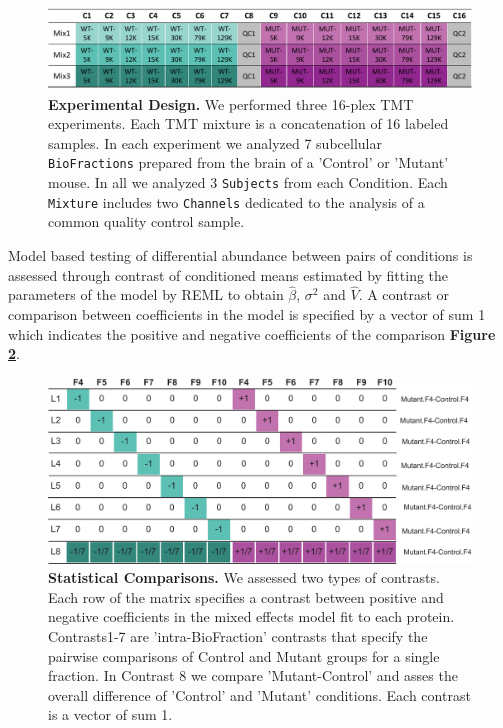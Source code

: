 \documentclass[11pt]{elife}\usepackage[]{graphicx}\usepackage[]{color}
\begin{document}
\begin{figure}[h]
  \begin{fullwidth}
  \begin{center}
	  \includegraphics[width=0.9\paperwidth,keepaspectratio]{design}
	  \caption{\textbf{Experimental Design.} We performed three 16-plex TMT
	  experiments. Each TMT mixture is a concatenation of 16 labeled
	  samples. In each experiment we analyzed 7 subcellular
	  \texttt{BioFractions} prepared from the brain of a 'Control' or
	  'Mutant' mouse. In all we analyzed 3 \texttt{Subjects} from each 
	  {Condition}. Each \texttt{Mixture} includes two \texttt{Channels}
	  dedicated to the analysis of a common quality control sample.}
	  \label{fig:design}
  \end{center}
  \end{fullwidth}
\end{figure}

Model based testing of differential abundance between pairs of conditions
is assessed through contrast of conditioned means estimated by fitting the
parameters of the model by REML to obtain $\hat{\beta}$, $\sigma^2$ and
$\hat{V}$. A contrast or comparison between coefficients in the model is
specified by a vector of sum 1 which indicates the positive and negative
coefficients of the comparison \textbf{Figure \ref{fig:contrasts}}.

\begin{figure}[h]
  \begin{fullwidth}
  \begin{center}
	  \includegraphics[width=0.9\paperwidth,keepaspectratio]{contrasts}
	  \caption{\textbf{Statistical Comparisons.} We assessed two types of
	  contrasts. Each row of the matrix specifies a contrast between
	  positive and negative coefficients in the mixed effects model fit to
	  each protein. Contrasts1-7 are 'intra-BioFraction' contrasts that
	  specify the pairwise comparisons of Control and Mutant groups for a
	  single fraction. In Contrast 8 we compare 'Mutant-Control' and asses
	  the overall difference of 'Control' and 'Mutant' conditions.  Each
	  contrast is a vector of sum 1.}
	  \label{fig:contrasts}
  \end{center}
  \end{fullwidth}
\end{figure}
\end{document}
